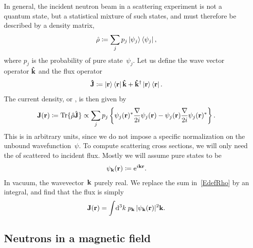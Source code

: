 In general, the incident neutron beam in a scattering experiment
is not a  quantum state,
%
%
but a statistical mixture of such states,
%
and must therefore be described by a density matrix,
%
%
\begin{equation}\label{EdefRho}
  \hat\rho \coloneqq \sum_j p_j \ket{\psi_j}\bra{\psi_j},
\end{equation}
where $p_j$ is the probability of pure state~$\psi_j$.
%
Let us define the wave vector operator $\mathbf{\hat k}$
%
and the flux operator
\begin{equation}\label{EdefJop}
  \mathbf{\hat J} \coloneqq  \ket{\mathbf{r}}\bra{\mathbf{r}}\mathbf{\hat k} + \mathbf{\hat k}^\dagger\ket{\mathbf{r}}\bra{\mathbf{r}}.
\end{equation}
The current density, or ,
%
%
is then given by
\begin{equation}\label{EdefJ}
  \mathbf{J}(\mathbf{r})
  \coloneqq \operatorname{Tr}\{\hat\rho \hat{\mathbf{J}}\}
  \propto \sum_j p_j\left\{ \psi_j(\mathbf{r})^*\frac{\mathbf{\nabla}}{2i}\psi_j(\mathbf{r})
                        - \psi_j(\mathbf{r})\frac{\mathbf{\nabla}}{2i}\psi_j(\mathbf{r})^*\right\}.
\end{equation}
%
This is in arbitrary units,
%
since we do not impose a specific normalization
%
on the unbound wavefunction~$\psi$.
To compute scattering cross sections,
%
%
we will only need the  of scattered to incident flux.
Mostly we will assume pure states to be 
%
%
\begin{equation}\label{EplaneWave}
  \psi_{\mathbf{k}}(\mathbf{r})\coloneqq\mathrm e^{i\mathbf{k}\mathbf{r}}.
\end{equation}
In vacuum, the wavevector~$\mathbf{k}$ purely real.
%
We replace the sum in~\cref{EdefRho} by an integral,
and find that the flux is simply
\begin{equation}
  \mathbf{J}(\mathbf{r}) = \int\!\mathrm d^3k\; p_{\mathbf{k}}\, |\psi_{\mathbf{k}}(\mathbf{r})|^2 \mathbf{k}.
\end{equation}

\subsection{Neutrons in a magnetic field}\label{SnSpinor}

